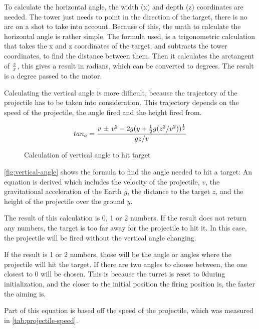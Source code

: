 

To calculate the horizontal angle, the width (x) and depth (z) coordinates are needed. The tower just needs to point in the direction of the target, there is no arc on a shot to take into account. Because of this, the math to calculate the horizontal angle is rather simple. The formula used, is a trigonometric calculation that takes the x and z coordinates of the target, and subtracts the tower coordinates, to find the distance between them. Then it calculates the arctangent of $z \over x$, this gives a result in radians, which can be converted to degrees. The result is a degree passed to the motor.

Calculating the vertical angle is more difficult, because the trajectory of the projectile has to be taken into consideration. This trajectory depends on the speed of the projectile, the angle fired and the height fired from.

\begin{figure}[htbp]
$$tan_a = {v \text{ \textpm} \text{ } v^2 - 2g(y + {1 \over 2}g(z^2/v^2))^{1 \over 2} \over gz/v}$$
\caption{Calculation of vertical angle to hit target}
\label{fig:vertical-angle}
\end{figure}

\autoref{fig:vertical-angle} shows the formula to find the angle needed to hit a target: An equation is derived which includes the velocity of the projectile, $v$, the gravitational acceleration of the Earth $g$, the distance to the target $z$, and the height of the projectile over the ground $y$. 

The result of this calculation is 0, 1 or 2 numbers. If the result does not return any numbers, the target is too far away for the projectile to hit it. In this case, the projectile will be fired without the vertical angle changing. 

If the result is 1 or 2 numbers, those will be the angle or angles where the projectile will hit the target. If there are two angles to choose between, the one closest to 0 \textdegree will be chosen. This is because the turret is reset to 0\textdegree \text{ }during initialization, and the closer to the initial position the firing position is, the faster the aiming is. 

Part of this equation is based off the speed of the projectile, which was measured in \autoref{tab:projectile-speed}. 
